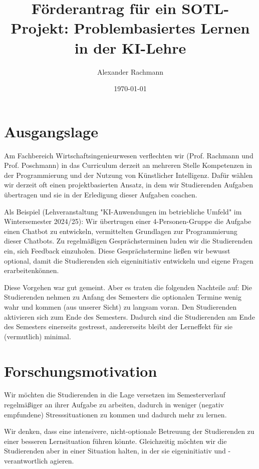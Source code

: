 \documentclass[a4paper,12pt]{article}
\title{Förderantrag für ein SOTL-Projekt: Problembasiertes Lernen in der KI-Lehre}
\author{Alexander Rachmann}
\date{\today}
\begin{document}
\maketitle

\section{Ausgangslage}

Am Fachbereich Wirtschaftsingenieurwesen verflechten wir (Prof. Rachmann und Prof. Poschmann) in das Curriculum derzeit an mehreren Stelle Kompetenzen in der Programmierung und der Nutzung von Künstlicher Intelligenz. Dafür wählen wir derzeit oft einen projektbasierten Ansatz, in dem wir Studierenden Aufgaben übertragen und sie in der Erledigung dieser Aufgaben coachen. 

Als Beispiel (Lehveranstaltung "KI-Anwendungen im betriebliche Umfeld" im Wintersemester 2024/25): Wir übertrugen einer 4-Personen-Gruppe die Aufgabe einen Chatbot zu entwickeln, vermittelten Grundlagen zur Programmierung dieser Chatbots. Zu regelmäßigen Gesprächsterminen luden wir die Studierenden ein, sich Feedback einzuholen. Diese Gesprächstermine ließen wir bewusst optional, damit die Studierenden sich eigeninitiativ entwickeln und eigene Fragen erarbeitenkönnen.

Diese Vorgehen war gut gemeint. Aber es traten die folgenden Nachteile auf: Die Studierenden nehmen zu Anfang des Semesters die optionalen Termine wenig wahr und kommen (aus unserer Sicht) zu langsam voran. Den Studierenden aktivieren sich zum Ende des Semesters. Dadurch sind die Studierenden am Ende des Semesters einerseits gestresst, andererseits bleibt der Lerneffekt für sie (vermutlich) minimal.

\section{Forschungsmotivation}

Wir möchten die Studierenden in die Lage versetzen im Semesterverlauf regelmäßiger an ihrer Aufgabe zu arbeiten, dadurch in weniger (negativ empfundene) Stresssituationen zu kommen und dadurch mehr zu lernen.

Wir denken, dass eine intensivere, nicht-optionale Betreuung der Studierenden zu einer besseren Lernsituation führen könnte. Gleichzeitig möchten wir die Studierenden aber in einer Situation halten, in der sie eigeninitiativ und -verantwortlich agieren.
\end{document}
